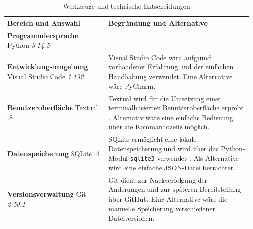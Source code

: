 \documentclass[11pt,a4paper]{article}
\begin{document}
\begin{table}[H]
    \centering
    \small
    \renewcommand{\arraystretch}{1.25}
    \caption{Werkzeuge und technische Entscheidungen}
    \label{tab:werkzeuge}

    \begin{tabularx}{\textwidth}{
        @{}
        >{\raggedright\arraybackslash}p{4.1cm}
        >{\raggedright\arraybackslash}X
        @{}
    }
        \toprule
        \textbf{Bereich und Auswahl} &
        \textbf{Begründung und Alternative} \\
        \midrule

        \textbf{Programmiersprache}
        \newline Python
        \newline \textit{3.14.5} &
        \\

        \textbf{Entwicklungsumgebung}
        \newline Visual Studio Code
        \newline \textit{1.132} &
        Visual Studio Code wird aufgrund vorhandener Erfahrung und der
        einfachen Handhabung verwendet. Eine Alternative wäre PyCharm. \\

        \textbf{Benutzeroberfläche}
        \newline Textual
        \newline 8.2.8 &
        Textual wird für die Umsetzung einer terminalbasierten Benutzeroberfläche
        erprobt \cite{textual}. Alternativ wäre eine einfache Bedienung über die
        Kommandozeile möglich. \\

        \textbf{Datenspeicherung}
        \newline SQLite
        \newline 3.50.4 &
        SQLite ermöglicht eine lokale Datenspeicherung und wird über das Python-Modul
        \texttt{sqlite3} verwendet \cite{python-sqlite}. Als Alternative wird eine
        einfache JSON-Datei betrachtet. \\

        \textbf{Versionsverwaltung}
        \newline Git
        \newline \textit{2.50.1} &
        Git dient zur Nachverfolgung der Änderungen und zur späteren
        Bereitstellung über GitHub. Eine Alternative wäre die manuelle
        Speicherung verschiedener Dateiversionen. \\

        \bottomrule
    \end{tabularx}
\end{table}
\end{document}
